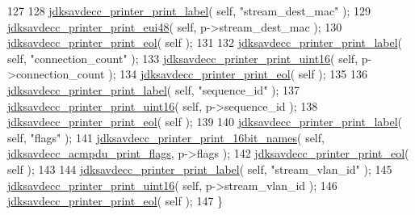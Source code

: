 \begin{DoxyCode}
127 
128     \hyperlink{group__util_gaf7818b24143b3c7502926a425a242ff5}{jdksavdecc\_printer\_print\_label}( \textcolor{keyword}{self}, \textcolor{stringliteral}{"stream\_dest\_mac"} );
129     \hyperlink{group__util_gacb8108c4a12e752331804ec34d89f9ab}{jdksavdecc\_printer\_print\_eui48}( \textcolor{keyword}{self}, p->stream\_dest\_mac );
130     \hyperlink{group__util_gacda56c9d3d24593a52c999682fa6e6e3}{jdksavdecc\_printer\_print\_eol}( \textcolor{keyword}{self} );
131 
132     \hyperlink{group__util_gaf7818b24143b3c7502926a425a242ff5}{jdksavdecc\_printer\_print\_label}( \textcolor{keyword}{self}, \textcolor{stringliteral}{"connection\_count"} );
133     \hyperlink{group__util_ga9793e0ff8e7ed25d957282ee6b257ce2}{jdksavdecc\_printer\_print\_uint16}( \textcolor{keyword}{self}, p->connection\_count );
134     \hyperlink{group__util_gacda56c9d3d24593a52c999682fa6e6e3}{jdksavdecc\_printer\_print\_eol}( \textcolor{keyword}{self} );
135 
136     \hyperlink{group__util_gaf7818b24143b3c7502926a425a242ff5}{jdksavdecc\_printer\_print\_label}( \textcolor{keyword}{self}, \textcolor{stringliteral}{"sequence\_id"} );
137     \hyperlink{group__util_ga9793e0ff8e7ed25d957282ee6b257ce2}{jdksavdecc\_printer\_print\_uint16}( \textcolor{keyword}{self}, p->sequence\_id );
138     \hyperlink{group__util_gacda56c9d3d24593a52c999682fa6e6e3}{jdksavdecc\_printer\_print\_eol}( \textcolor{keyword}{self} );
139 
140     \hyperlink{group__util_gaf7818b24143b3c7502926a425a242ff5}{jdksavdecc\_printer\_print\_label}( \textcolor{keyword}{self}, \textcolor{stringliteral}{"flags"} );
141     \hyperlink{group__util_gab2b52d5747dd94956e7c008203606eae}{jdksavdecc\_printer\_print\_16bit\_names}( \textcolor{keyword}{self}, 
      \hyperlink{group__acmp__print_gae4346c62b401222d113a73dc5f5f3cfe}{jdksavdecc\_acmpdu\_print\_flags}, p->flags );
142     \hyperlink{group__util_gacda56c9d3d24593a52c999682fa6e6e3}{jdksavdecc\_printer\_print\_eol}( \textcolor{keyword}{self} );
143 
144     \hyperlink{group__util_gaf7818b24143b3c7502926a425a242ff5}{jdksavdecc\_printer\_print\_label}( \textcolor{keyword}{self}, \textcolor{stringliteral}{"stream\_vlan\_id"} );
145     \hyperlink{group__util_ga9793e0ff8e7ed25d957282ee6b257ce2}{jdksavdecc\_printer\_print\_uint16}( \textcolor{keyword}{self}, p->stream\_vlan\_id );
146     \hyperlink{group__util_gacda56c9d3d24593a52c999682fa6e6e3}{jdksavdecc\_printer\_print\_eol}( \textcolor{keyword}{self} );
147 \}
\end{DoxyCode}


